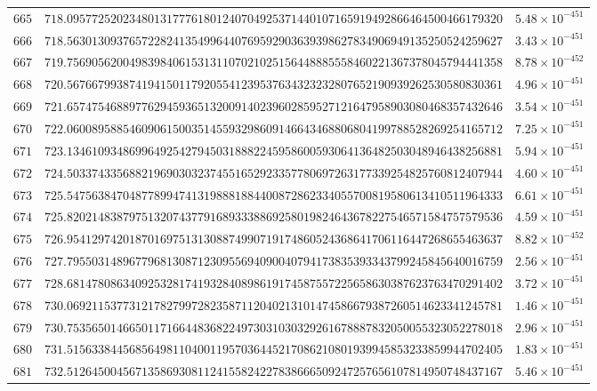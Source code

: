 \documentclass[12pt,reqno]{amsart}
\theoremstyle{remark}
\begin{document}
\begin{longtable}{clc}
$665$ & $718.0957725202348013177761801240704925371440107165919492866464500466179320$ & $5.48\times 10^{-451}$ \\
$666$ & $718.5630130937657228241354996440769592903639398627834906949135250524259627$ & $3.43\times 10^{-451}$ \\
$667$ & $719.7569056200498398406153131107021025156448885558460221367378045794441358$ & $8.78\times 10^{-452}$ \\
$668$ & $720.5676679938741941501179205541239537634323232807652190939262530580830361$ & $4.96\times 10^{-451}$ \\
$669$ & $721.6574754688977629459365132009140239602859527121647958903080468357432646$ & $3.54\times 10^{-451}$ \\
$670$ & $722.0600895885460906150035145593298609146643468806804199788528269254165712$ & $7.25\times 10^{-451}$ \\
$671$ & $723.1346109348699649254279450318882245958600593064136482503048946438256881$ & $5.94\times 10^{-451}$ \\
$672$ & $724.5033743356882196903032374551652923357780697263177339254825760812407944$ & $4.60\times 10^{-451}$ \\
$673$ & $725.5475638470487789947413198881884400872862334055700819580613410511964333$ & $6.61\times 10^{-451}$ \\
$674$ & $725.8202148387975132074377916893338869258019824643678227546571584757579536$ & $4.59\times 10^{-451}$ \\
$675$ & $726.9541297420187016975131308874990719174860524368641706116447268655463637$ & $8.82\times 10^{-452}$ \\
$676$ & $727.7955031489677968130871230955694090040794173835393343799245845640016759$ & $2.56\times 10^{-451}$ \\
$677$ & $728.6814780863409253281741932840898619174587557225658630387623763470291402$ & $3.72\times 10^{-451}$ \\
$678$ & $730.0692115377312178279972823587112040213101474586679387260514623341245781$ & $1.46\times 10^{-451}$ \\
$679$ & $730.7535650146650117166448368224973031030329261678887832050055323052278018$ & $2.96\times 10^{-451}$ \\
$680$ & $731.5156338445685649811040011957036445217086210801939945853233859944702405$ & $1.83\times 10^{-451}$ \\
$681$ & $732.5126450045671358693081124155824227838666509247257656107814950748437167$ & $5.46\times 10^{-451}$ \\

\end{longtable}
\end{document}
